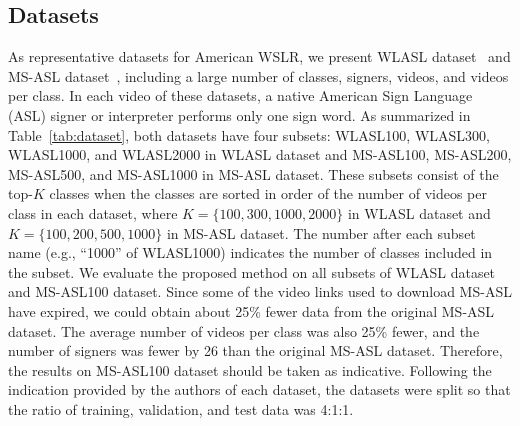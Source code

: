 \documentclass[journal]{IEEEtran}
\begin{document}
\subsection{Datasets}
As representative datasets for American WSLR, we present WLASL dataset~\cite{li2020word} and MS-ASL dataset~\cite{vaezi2019ms-asl}, including a large number of classes, signers, videos, and videos per class. In each video of these datasets, a native American Sign Language (ASL) signer or interpreter performs only one sign word.
As summarized in Table~\ref{tab:dataset}, both datasets have four subsets: WLASL100, WLASL300, WLASL1000, and WLASL2000 in WLASL dataset and MS-ASL100, MS-ASL200, MS-ASL500, and MS-ASL1000 in MS-ASL dataset.
These subsets consist of the top-$K$ classes when the classes are sorted in order of the number of videos per class in each dataset, where $K=\{100, 300, 1000, 2000\}$ in WLASL dataset and $K=\{100, 200, 500, 1000\}$ in MS-ASL dataset.
The number after each subset name (e.g., ``1000'' of WLASL1000) indicates the number of classes included in the subset.
We evaluate the proposed method on all subsets of WLASL dataset and MS-ASL100 dataset.
Since some of the video links used to download MS-ASL have expired, we could obtain about 25\% fewer data from the original MS-ASL dataset. The average number of videos per class was also 25\% fewer, and the number of signers was fewer by 26 than the original MS-ASL dataset.
Therefore, the results on MS-ASL100 dataset should be taken as indicative.
Following the indication provided by the authors of each dataset, the datasets were split so that the ratio of training, validation, and test data was 4:1:1.
\end{document}
